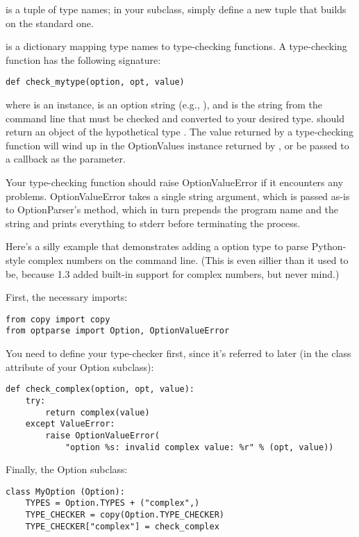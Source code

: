  is a tuple of type names; in your subclass, simply define a new
tuple  that builds on the standard one.

 is a dictionary mapping type names to type-checking
functions.  A type-checking function has the following signature:
\begin{verbatim}
def check_mytype(option, opt, value)
\end{verbatim}

where  is an  instance,  is an option string
(e.g., ), and  is the string from the command line that
must be checked and converted to your desired type.  
should return an object of the hypothetical type .  The value
returned by a type-checking function will wind up in the OptionValues
instance returned by , or be passed to a
callback as the  parameter.

Your type-checking function should raise OptionValueError if it
encounters any problems.  OptionValueError takes a single string
argument, which is passed as-is to OptionParser's  method,
which in turn prepends the program name and the string  and
prints everything to stderr before terminating the process.

Here's a silly example that demonstrates adding a  option
type to parse Python-style complex numbers on the command line.  (This
is even sillier than it used to be, because  1.3 added built-in
support for complex numbers, but never mind.)

First, the necessary imports:
\begin{verbatim}
from copy import copy
from optparse import Option, OptionValueError
\end{verbatim}

You need to define your type-checker first, since it's referred to later
(in the  class attribute of your Option subclass):
\begin{verbatim}
def check_complex(option, opt, value):
    try:
        return complex(value)
    except ValueError:
        raise OptionValueError(
            "option %s: invalid complex value: %r" % (opt, value))
\end{verbatim}

Finally, the Option subclass:
\begin{verbatim}
class MyOption (Option):
    TYPES = Option.TYPES + ("complex",)
    TYPE_CHECKER = copy(Option.TYPE_CHECKER)
    TYPE_CHECKER["complex"] = check_complex
\end{verbatim}

